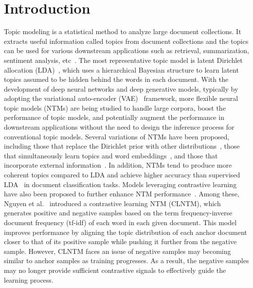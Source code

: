 \documentclass{article}
\begin{document}
\section{Introduction}\label{sec1}
Topic modeling is a statistical method to analyze large document collections. It extracts useful information called topics from document collections and the topics can be used for various downstream applications such as retrieval, summarization, sentiment analysis, etc~\cite{blei2012probabilistic,ijcai2021p638}.
The most representative topic model is latent Dirichlet allocation (LDA)~\cite{blei2003latent}, which uses a hierarchical Bayesian structure to learn latent topics assumed to be hidden behind the words in each document.  
With the development of deep neural networks and deep generative models, typically by adopting the variational auto-encoder (VAE)~\cite{welling2014auto} framework, more flexible neural topic models (NTMs) are being studied to handle large corpora, boost the performance of topic models, and potentially augment the performance in downstream applications without the need to design the inference process for conventional topic models.
Several variations of NTMs have been proposed, including those that replace the Dirichlet prior with other distributions~\cite{miao2017discovering,srivastava2017autoencoding}, those that simultaneously learn topics and word embeddings~\cite{dieng2020topic}, and those that incorporate external information~\cite{card2018neural,bai2018neural,hoyle2020improving,wang2021layer,wang2021extracting,tang2024beyond}.
In addition, NTMs tend to produce more coherent topics compared to LDA and achieve higher accuracy than supervised LDA~\cite{mcauliffe2007supervised} in document classification tasks. 
Models leveraging contrastive learning have also been proposed to further enhance NTM performance~\cite{nguyen2021contrastive,wu2022mitigating,zhang2022meta,han2023unified}.
Among these, Nguyen et al.~\cite{nguyen2021contrastive} introduced a contrastive learning NTM (CLNTM), which generates positive and negative samples based on the term frequency-inverse document frequency (tf-idf) of each word in each given document. This model improves performance by aligning the topic distribution of each anchor document closer to that of its positive sample while pushing it further from the negative sample. 
However, CLNTM faces an issue of negative samples may becoming similar to anchor samples as training progresses. As a result, the negative samples may no longer provide sufficient contrastive signals to effectively guide the learning process. 
\end{document}
